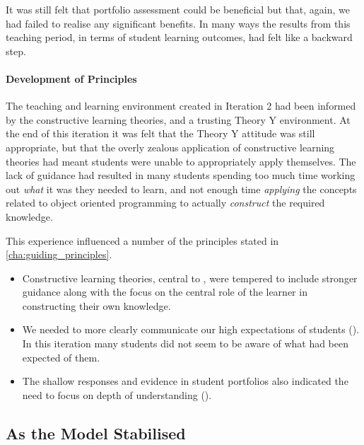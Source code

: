 It was still felt that portfolio assessment could be beneficial but that, again, we had failed to realise any significant benefits. In many ways the results from this teaching period, in terms of student learning outcomes, had felt like a backward step.

\paragraph{Development of Principles} %

The teaching and learning environment created in Iteration 2 had been informed by the constructive learning theories, and a trusting Theory Y environment. At the end of this iteration it was felt that the Theory Y attitude was still appropriate, but that the overly zealous application of constructive learning theories had meant students were unable to appropriately apply themselves. The lack of guidance had resulted in many students spending too much time working out \emph{what} it was they needed to learn, and not enough time \emph{applying} the concepts related to object oriented programming to actually \emph{construct} the required knowledge.

This experience influenced a number of the principles stated in \cref{cha:guiding_principles}. 

\begin{itemize}[noitemsep,nolistsep]
	\item Constructive learning theories, central to , were tempered to include stronger guidance along with the focus on the central role of the learner in constructing their own knowledge. 
	\item We needed to more clearly communicate our high expectations of students (). In this iteration many students did not seem to be aware of what had been expected of them.
	\item The shallow responses and evidence in student portfolios also indicated the need to focus on depth of understanding ().
\end{itemize}


\clearpage
\subsection{As the Model Stabilised} %
\label{sub:as_the_model_stabilised}

